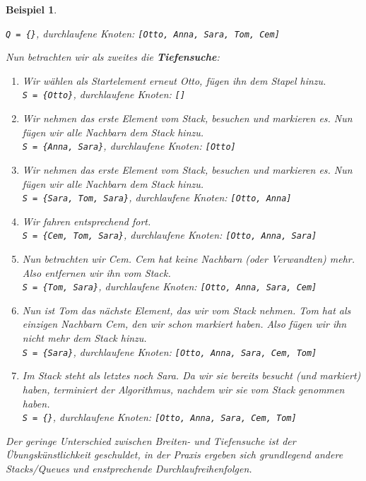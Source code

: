 \documentclass[11pt,a4paper]{scrartcl}
\newtheorem{example}{Beispiel}
\begin{document}
\begin{example}
\begin{enumerate}
\texttt{Q = \{\}}, durchlaufene Knoten: \texttt{[Otto, Anna, Sara, Tom, Cem]}
\end{enumerate}
Nun betrachten wir als zweites die \textbf{Tiefensuche}:
\begin{enumerate}
\item Wir wählen als Startelement erneut Otto, fügen ihn dem Stapel hinzu. \\
\texttt{S = \{Otto\}}, durchlaufene Knoten: \texttt{[]}
\item Wir nehmen das erste Element vom Stack, besuchen und markieren es. Nun fügen wir alle Nachbarn dem Stack hinzu. \\
\texttt{S = \{Anna, Sara\}}, durchlaufene Knoten: \texttt{[Otto]}
\item Wir nehmen das erste Element vom Stack, besuchen und markieren es. Nun fügen wir alle Nachbarn dem Stack hinzu. \\
\texttt{S = \{Sara, Tom, Sara\}}, durchlaufene Knoten: \texttt{[Otto, Anna]}
\item Wir fahren entsprechend fort. \\
\texttt{S = \{Cem, Tom, Sara\}}, durchlaufene Knoten: \texttt{[Otto, Anna, Sara]}
\item Nun betrachten wir Cem. Cem hat keine Nachbarn (oder Verwandten) mehr. Also entfernen wir ihn vom Stack. \\
\texttt{S = \{Tom, Sara\}}, durchlaufene Knoten: \texttt{[Otto, Anna, Sara, Cem]}
\item Nun ist Tom das nächste Element, das wir vom Stack nehmen. Tom hat als einzigen Nachbarn Cem, den wir schon markiert haben. Also fügen wir ihn nicht mehr dem Stack hinzu. \\
\texttt{S = \{Sara\}}, durchlaufene Knoten: \texttt{[Otto, Anna, Sara, Cem, Tom]}
\item Im Stack steht als letztes noch Sara. Da wir sie bereits besucht (und markiert) haben, terminiert der Algorithmus, nachdem wir sie vom Stack genommen haben. \\
\texttt{S = \{\}}, durchlaufene Knoten: \texttt{[Otto, Anna, Sara, Cem, Tom]}
\end{enumerate}
Der geringe Unterschied zwischen Breiten- und Tiefensuche ist der Übungskünstlichkeit geschuldet, in der Praxis ergeben sich grundlegend andere Stacks/Queues und enstprechende Durchlaufreihenfolgen.
\end{example}
\end{document}
